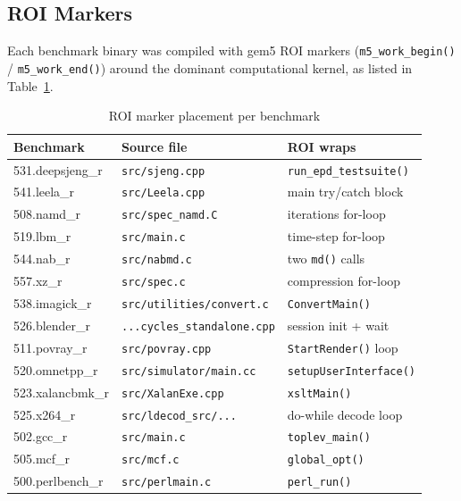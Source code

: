 \documentclass[11pt,a4paper]{article}
\begin{document}
\subsection{ROI Markers}

Each benchmark binary was compiled with gem5 ROI markers
(\texttt{m5\_work\_begin()} / \texttt{m5\_work\_end()}) around
the dominant computational kernel, as listed in Table~\ref{tab:roi_markers}.

\begin{table}[H]
\centering
\caption{ROI marker placement per benchmark}
\label{tab:roi_markers}
\small
\begin{tabular}{lll}
\toprule
\textbf{Benchmark} & \textbf{Source file} & \textbf{ROI wraps} \\
\midrule
531.deepsjeng\_r & \texttt{src/sjeng.cpp}            & \texttt{run\_epd\_testsuite()} \\
541.leela\_r     & \texttt{src/Leela.cpp}             & main try/catch block \\
508.namd\_r      & \texttt{src/spec\_namd.C}          & iterations for-loop \\
519.lbm\_r       & \texttt{src/main.c}                & time-step for-loop \\
544.nab\_r       & \texttt{src/nabmd.c}               & two \texttt{md()} calls \\
557.xz\_r        & \texttt{src/spec.c}                & compression for-loop \\
538.imagick\_r   & \texttt{src/utilities/convert.c}   & \texttt{ConvertMain()} \\
526.blender\_r   & \texttt{...cycles\_standalone.cpp} & session init + wait \\
511.povray\_r    & \texttt{src/povray.cpp}            & \texttt{StartRender()} loop \\
520.omnetpp\_r   & \texttt{src/simulator/main.cc}     & \texttt{setupUserInterface()} \\
523.xalancbmk\_r & \texttt{src/XalanExe.cpp}          & \texttt{xsltMain()} \\
525.x264\_r      & \texttt{src/ldecod\_src/...}       & do-while decode loop \\
502.gcc\_r       & \texttt{src/main.c}                & \texttt{toplev\_main()} \\
505.mcf\_r       & \texttt{src/mcf.c}                 & \texttt{global\_opt()} \\
500.perlbench\_r & \texttt{src/perlmain.c}            & \texttt{perl\_run()} \\
\bottomrule
\end{tabular}
\end{table}
\end{document}
